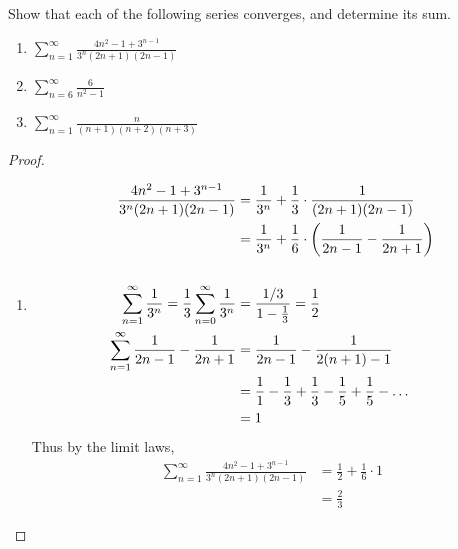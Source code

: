 \documentclass[12pt]{article}
\begin{document}
\begin{problem}
    Show that each of the following series converges, and determine its sum.
    \begin{enumerate}[label=(\alph*)]
        \item $\sum\limits_{n=1}^{\infty} \frac{4n^{2} - 1 + 3^{n-1}}{3^{n}(2n+1)(2n-1)}$
        \item $\sum\limits_{n=6}^{\infty} \frac{6}{n^{2} - 1}$
        \item $\sum\limits_{n=1}^{\infty} \frac{n}{(n + 1)(n + 2)(n + 3)}$
    \end{enumerate}
\end{problem}

\begin{proof} \leavevmode
    \begin{enumerate}[label=(\alph*)]
        \item
        \begin{align*}
            \frac{4n^{2} - 1 + 3^{n-1}}{3^{n} (2n + 1)(2n - 1)} &= \frac{1}{3^{n}} + \frac{1}{3} \cdot \frac{1}{(2n + 1)(2n - 1)} \\
            &= \frac{1}{3^{n}} + \frac{1}{6} \cdot \paren{\frac{1}{2n-1} - \frac{1}{2n+1}} \\
            \\
            \sum_{n=1}^{\infty} \frac{1}{3^{n}} = \frac{1}{3} \sum_{n=0}^{\infty} \frac{1}{3^{n}} &= \frac{1 / 3}{1-\frac{1}{3}} = \frac{1}{2} \\
            \sum_{n=1}^{\infty} \frac{1}{2n-1} - \frac{1}{2n+1} &= \frac{1}{2n-1} - \frac{1}{2(n+1) - 1} \\
            &= \frac{1}{1} - \frac{1}{3} + \frac{1}{3} - \frac{1}{5} + \frac{1}{5} - \dots \\
            &= 1
        \end{align*}
        Thus by the limit laws,
        \begin{align*}
            \sum_{n=1}^{\infty} \frac{4n^{2} - 1 + 3^{n-1}}{3^{n} (2n + 1)(2n - 1)} &= \frac{1}{2} + \frac{1}{6} \cdot 1 \\
            &= \frac{2}{3}
        \end{align*}


\end{enumerate}
\end{proof}
\end{document}
